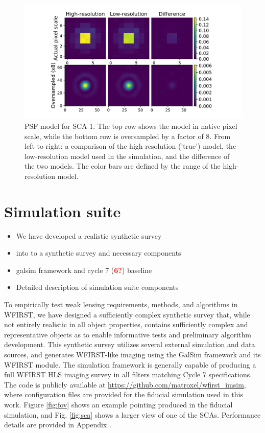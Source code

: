 \documentclass[aps,prd, amsmath,amssymb,superscriptaddress,showkeys,nofootinbib,reprint,preprintnumbers]{revtex4-1}
\newcommand{\verify}[1]{\textcolor{red}{\textbf{{#1}}}}
\begin{document}
\begin{figure}
\begin{center}
\includegraphics[width=\columnwidth]{figures/psf.pdf}
\end{center}
\caption[]{
PSF model for SCA 1. The top row shows the model in native pixel scale, while the bottom row is oversampled by a factor of 8. From left to right: a comparison of the high-resolution ('true') model, the low-resolution model used in the simulation, and the difference of the two models. The color bars are defined by the range of the high-resolution model.
\label{fig:psf}}
\end{figure}


\section{Simulation suite}\label{sec:sim}

\begin{itemize}
\item We have developed a realistic synthetic survey 
\item into to a synthetic survey and necessary components
\item galsim framework and cycle 7 (\verify{6?}) baseline
\item Detailed description of simulation suite components
\end{itemize}

To empirically test weak lensing requirements, methods, and algorithms in WFIRST, we have designed a sufficiently complex synthetic survey that, while not entirely realistic in all object properties, contains sufficiently complex and representative objects as to enable informative tests and preliminary algorithm development. 
This synthetic survey utilizes several external simulation and data sources, and generates WFIRST-like imaging using the GalSim framework and its WFIRST module. 
The simulation framework is generally capable of producing a full WFIRST HLS imaging survey in all filters matching Cycle 7 specifications. 
The code is publicly available at \url{https://github.com/matroxel/wfirst_imsim}, where configuration files are provided for the fiducial simulation used in this work.
Figure \ref{fig:fov} shows an example pointing produced in the fiducial simulation, and Fig. \ref{fig:sca} shows a larger view of one of the SCAs. 
Performance details are provided in Appendix \cite{app:performance}. 
\end{document}
